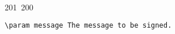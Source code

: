 201~200~\documentclass{article}
\begin{document}
\begin{lstlisting}[language=Python, caption=Signing and Verifying Messages]
	                                                                                                                                                                                                                                                                                                	                                                                                                                                        	    	                                                                                                	                                                                                                                                                                                                                                                                                                                                	                                                                        	                                                                        	                                                                                                                                        	                                                                                                                                                                                                                        	                                                                                                                \param message The message to be signed.
	                                                                                                                                                                                                                                                                                                	                                                                                                                                        	    	                                                                                                	                                                                                                                                                                                                                                                                                                                                	                                                                        	                                                                        	                                                                                                                                        	                                                                                                                                                                                                                        	                                                                                                                    \return The generated signature.

\end{lstlisting}
\end{document}
